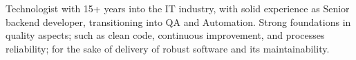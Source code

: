 

\begin{cvparagraph}

	Technologist with 15+ years into the IT industry, with solid experience as Senior backend developer, transitioning into QA and Automation. Strong foundations in quality aspects; such as clean code, continuous improvement, and processes reliability; for the sake of delivery of robust software and its maintainability. \end{cvparagraph}
